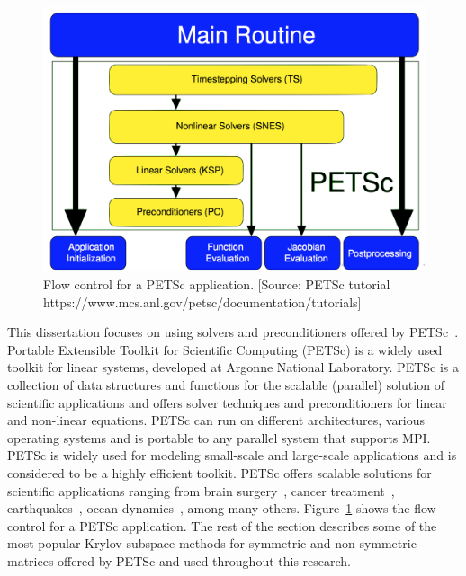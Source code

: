 \begin{figure}
\begin{center}
 \includegraphics[width=0.7\linewidth]{figures/FlowControlForPETScApplication.png}
\end{center}
\caption{Flow control for a PETSc application. [Source: PETSc tutorial https://www.mcs.anl.gov/petsc/documentation/tutorials]\label{fig:petscFlow}}
\end{figure}

This dissertation focuses on using solvers and preconditioners offered by PETSc~\cite{petsc}. Portable Extensible Toolkit for Scientific Computing (PETSc) is a widely used toolkit for linear systems, developed at Argonne National Laboratory. PETSc is a collection of data structures and functions for the scalable (parallel) solution of scientific applications and offers solver techniques and preconditioners for linear and non-linear equations. PETSc can run on different architectures, various operating systems and is portable to any parallel system that supports MPI. PETSc is widely used for modeling small-scale and large-scale applications and is considered to be a highly efficient toolkit. PETSc offers scalable solutions for scientific applications ranging from brain surgery~\cite{petscapp1}, cancer treatment~\cite{petscapp2}, earthquakes~\cite{petscapp3}, ocean dynamics~\cite{petscapp4}, among many others. Figure~\ref{fig:petscFlow} shows the flow control for a PETSc application. The rest of the section describes some of the most popular Krylov subspace methods for symmetric and non-symmetric matrices offered by PETSc and used throughout this research. 


